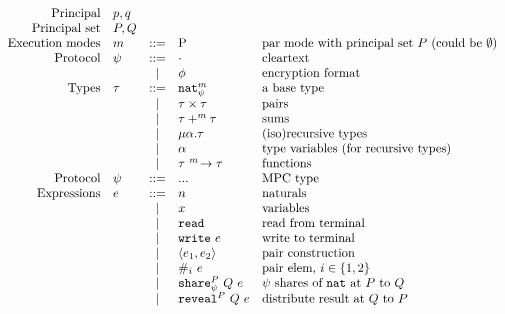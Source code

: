 \documentclass[10pt]{article}
\newcommand{\kw}[1]{\ensuremath{\mathtt{#1}}}
\newcommand{\tnat}{\ensuremath{\mathtt{nat}}}
\newcommand{\tfun}[3]{\ensuremath{{#1} ~^{#3}\!\rightarrow {#2}}}
\newcommand{\tpair}[2]{\ensuremath{{#1} \times {#2}}}
\newcommand{\tsum}[3]{\ensuremath{{#1} +^{#3} {#2}}}
\newcommand{\trec}[2]{\ensuremath{\mu {#1}.{#2}}}
\newcommand{\ereveal}[3]{\ensuremath{\kw{reveal}^{#1}~{#2}~{#3}}}
\newcommand{\eshare}[4]{\ensuremath{\kw{share}^{#2}_{#1}~{#3}~{#4}}}
\newcommand{\eread}{\ensuremath{\kw{read}}}
\newcommand{\ewrite}[1]{\ensuremath{\kw{write}~{#1}}}
\newcommand{\epair}[2]{\ensuremath{\langle {#1}, {#2} \rangle}}
\newcommand{\eproj}[2]{\ensuremath{\kw{\#}}_{#1}~{#2}}
\begin{document}
\begin{figure}[h]
  \centering
  \[\begin{array}{rlcll}
      \text{Principal} & p, q \\
      \text{Principal set} & P, Q \\
    \text{Execution modes} & m  & ::=  & $P$ & \text{par mode with principal set $P$ (could be $\emptyset$)} \\
      \text{Protocol} & \psi & ::= & \cdot & \text{cleartext} \\
                       && \mid & \phi & \text{encryption format} \\
      \text{Types} & \tau & ::=  & \tnat^m_\psi & \text{a base type} \\
                       && \mid & \tpair{\tau}{\tau} & \text{pairs} \\
                       && \mid & \tsum{\tau}{\tau}{m} & \text{sums} \\
                       && \mid & \trec{\alpha}{\tau} & \text{(iso)recursive types} \\
                       && \mid & \alpha & \text{type variables (for recursive types)} \\
                       && \mid & \tfun{\tau}{\tau}{m} & \text{functions} \\
      \text{Protocol} & \psi & ::= & ... & \text{MPC type} \\
      \text{Expressions} & e & ::= & n & \text{naturals} \\
                       && \mid & x & \text{variables} \\
                       && \mid & \eread & \text{read from terminal}\\
                       && \mid & \ewrite{e} & \text{write to terminal}\\
                       && \mid & \epair{e_1}{e_2} & \text{pair construction}\\
                       && \mid & \eproj{i}{e} & \text{pair elem, }i \in \{1,2\}\\
                       && \mid & \eshare{\psi}{P}{Q}{e} & \text{$\psi$ shares of {\tnat} at $P$ to $Q$} \\
                       && \mid & \ereveal{P}{Q}{e} & \text{distribute result at $Q$ to $P$}\\

\end{array}\]
\end{figure}
\end{document}
